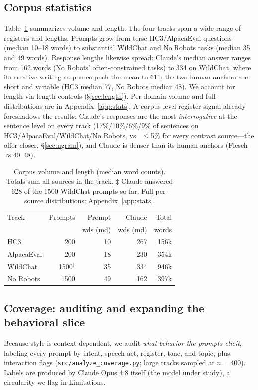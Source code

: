 \documentclass[11pt]{article}
\begin{document}
\subsection{Corpus statistics}
\label{sec:stats}
Table~\ref{tab:stats} summarizes volume and length. The four tracks span a wide
range of registers and lengths. Prompts grow from terse HC3/AlpacaEval questions
(median 10--18 words) to substantial WildChat and No Robots tasks (median 35 and
49 words). Response lengths likewise spread: Claude's median answer ranges from
162 words (No Robots' often-constrained tasks) to 334 on WildChat, where its
creative-writing responses push the mean to 611; the two human anchors are short
and variable (HC3 median 77, No Robots median 48). We account for length via
length controls (\S\ref{sec:length}). Per-domain volume and full distributions are
in Appendix~\ref{app:stats}. A corpus-level register signal already foreshadows
the results: Claude's responses are the most \emph{interrogative} at the sentence
level on every track (17\%/10\%/6\%/9\% of sentences on HC3/AlpacaEval/WildChat/No
Robots, vs.\ $\le$5\% for every contrast source---the offer-closer,
\S\ref{sec:ngram}), and Claude is denser than its human anchors (Flesch
$\approx$40--48).

\begin{table}[t]
\centering\small
\setlength{\tabcolsep}{4pt}
\begin{tabular}{@{}lrrrr@{}}
\toprule
Track & Prompts & Prompt & Claude & Total \\
 & & wds (md) & wds (md) & words \\
\midrule
HC3 & 200 & 10 & 267 & 156k \\
AlpacaEval & 200 & 18 & 230 & 354k \\
WildChat & 1500$^\ddagger$ & 35 & 334 & 946k \\
No Robots & 1500 & 49 & 162 & 397k \\
\bottomrule
\end{tabular}
\caption{Corpus volume and length (median word counts). Totals sum all sources in
the track. $\ddagger$ Claude answered 628 of the 1500 WildChat prompts so far.
Full per-source distributions: Appendix~\ref{app:stats}.}
\label{tab:stats}
\end{table}

\subsection{Coverage: auditing and expanding the behavioral slice}
\label{sec:coverage}
Because style is context-dependent, we audit \emph{what behavior the prompts
elicit}, labeling every prompt by intent, speech act, register, tone, and topic,
plus interaction flags (\texttt{src/analyze\_coverage.py}; large tracks sampled at
$n{=}400$). Labels are produced by Claude Opus 4.8 itself (the model under study),
a circularity we flag in Limitations.
\end{document}
